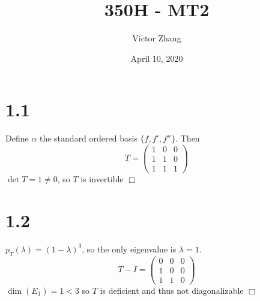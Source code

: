 \documentclass{article}
\title{350H - MT2}
\author{Victor Zhang}
\date{April 10, 2020}
\begin{document}
\maketitle

\section*{1.1}
Define $\alpha$ the standard ordered basis $\{f,f',f''\}$. Then
$$T = \left( \begin{matrix} 1 & 0 & 0 \\ 1 & 1 & 0 \\ 1 & 1 & 1 \end{matrix} \right)$$
$\det T = 1 \neq 0$, so $T$ is invertible $\Box$

\section*{1.2}
$p_T(\lambda) = (1-\lambda)^3$, so the only eigenvalue is $\lambda = 1$.
$$T - I = \left( \begin{matrix} 0 & 0 & 0 \\ 1 & 0 & 0 \\ 1 & 1 & 0 \end{matrix} \right)$$
$\dim (E_1) = 1 < 3$ so $T$ is deficient and thus not diagonalizable $\Box$
\end{document}

